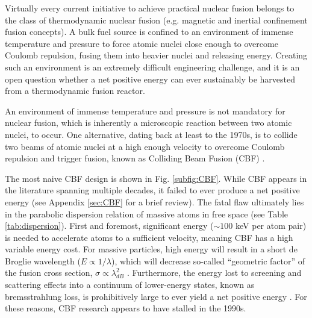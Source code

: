 \documentclass[onecolumn,
               superscriptaddress,
               floatfix,
               longbibliography, 
               showkeys,apl]{revtex4-2}
\begin{document}
Virtually every current initiative to achieve practical nuclear fusion belongs to the class of thermodynamic nuclear fusion (e.g. magnetic and inertial confinement fusion concepts). A bulk fuel source is confined to an environment of immense temperature and pressure to force atomic nuclei close enough to overcome Coulomb repulsion, fusing them into heavier nuclei and releasing energy. Creating such an environment is an extremely difficult engineering challenge, and it is an open question whether a net positive energy can ever sustainably be harvested from a thermodynamic fusion reactor.

An environment of immense temperature and pressure is not mandatory for nuclear fusion, which is inherently a microscopic reaction between two atomic nuclei, to occur. One alternative, dating back at least to the 1970s, is to collide two beams of atomic nuclei at a high enough velocity to overcome Coulomb repulsion and trigger fusion, known as Colliding Beam Fusion (CBF) \cite{MAGLICH1973213,MAGLICH1975IEEE,blewett197xcbf}. 

The most naive CBF design is shown in Fig. \ref{subfig:CBF}. While CBF appears in the literature spanning multiple decades, it failed to ever produce a net positive energy (see Appendix \ref{sec:CBF} for a brief review). The fatal flaw ultimately lies in the parabolic dispersion relation of massive atoms in free space (see Table \ref{tab:dispersion}). First and foremost, significant energy ($\sim100$ keV per atom pair) is needed to accelerate atoms to a sufficient velocity, meaning CBF has a high variable energy cost. For massive particles, high energy will result in a short de Broglie wavelength ($E \propto 1/\lambda$), which will decrease so-called ``geometric factor'' of the fusion cross section, $\sigma \propto \lambda_{dB}^2$ \cite{LI20061517}. Furthermore, the energy lost to screening and scattering effects into a continuum of lower-energy states, known as bremsstrahlung loss, is prohibitively large to ever yield a net positive energy \cite{Ridder1994}. For these reasons, CBF research appears to have stalled in the 1990s.
\end{document}
